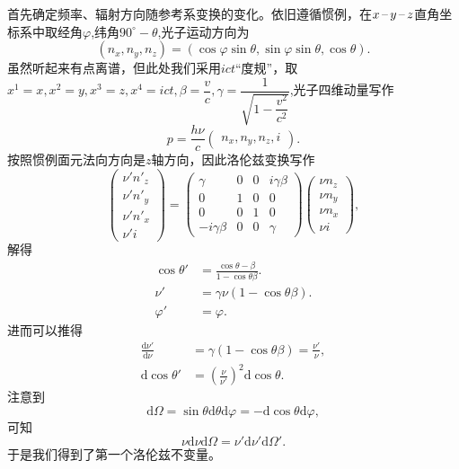 \documentclass[../天体物理基础.tex]{subfiles}
\begin{document}
首先确定频率、辐射方向随参考系变换的变化。依旧遵循惯例，在$x\,\text{\textendash}\,y\,\text{\textendash}\,z$直角坐标系中取经角$\varphi$,纬角$90^{\circ}-\theta$,光子运动方向为
\begin{equation}
\left(n_x,n_y,n_z\right)=\left(\cos\varphi\sin\theta,\sin\varphi\sin\theta,\cos\theta\right).
\end{equation}
虽然听起来有点离谱，但此处我们采用$ict$“度规”，取$x^{1}=x,x^{2}=y,x^{3}=z,x^{4}=ict,\beta=\dfrac{v}{c},\gamma=\dfrac{1}{\sqrt{1-\dfrac{v^2}{c^2}}}$,光子四维动量写作
\begin{equation}
p=\frac{h\nu}{c}
\begin{pmatrix}
n_x,n_y,n_z,i
\end{pmatrix}.
\end{equation}
按照惯例面元法向方向是$z$轴方向，因此洛伦兹变换写作
\begin{equation}
\begin{pmatrix}
\nu' n'_z\\\nu' n'_y\\\nu' n'_x\\\nu' i
\end{pmatrix}=
\begin{pmatrix}
\gamma & 0 & 0 & i\gamma\beta\\
0 & 1 & 0 & 0\\
0 & 0 & 1 & 0\\
-i\gamma\beta & 0 & 0 &\gamma
\end{pmatrix}
\begin{pmatrix}
\nu n_z\\\nu n_y\\\nu n_x\\\nu i
\end{pmatrix},
\end{equation}
解得
\begin{align}
\cos\theta'&=\frac{\cos\theta-\beta}{1-\cos\theta\beta}.\\
\nu'&=\gamma\nu\left(1-\cos\theta\beta\right).\\
\varphi'&=\varphi.
\end{align}
进而可以推得
\begin{align}
\frac{\mathrm{d}\nu'}{\mathrm{d}\nu}&=\gamma\left(1-\cos\theta\beta\right)=\frac{\nu'}{\nu},\\
\mathrm{d}\cos\theta'&=\left(\frac{\nu}{\nu'}\right)^2\mathrm{d}\cos\theta.
\end{align}
注意到
\begin{equation}
\mathrm{d}\Omega=\sin\theta\mathrm{d}\theta\mathrm{d}\varphi=-\mathrm{d}\cos\theta\mathrm{d}\varphi,
\end{equation}
可知
\begin{equation}
\nu\mathrm{d}\nu\mathrm{d}\Omega=\nu'\mathrm{d}\nu'\mathrm{d}\Omega'.
\end{equation}
于是我们得到了第一个洛伦兹不变量。
\end{document}
